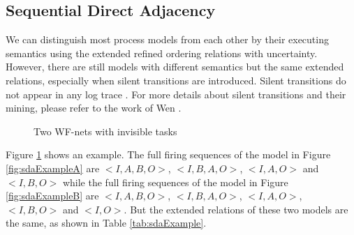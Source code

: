 \documentclass[dvips,...]{llncs}
\begin{document}
\subsection{Sequential Direct Adjacency}\label{subsec:sda}
We can distinguish most process models from each other by their executing semantics using the extended refined ordering relations with uncertainty. However, there are still models with different semantics but the same extended relations, especially when silent transitions are introduced. Silent transitions do not appear in any log trace \cite{de2003workflow} . For more details about silent transitions and their mining, please refer to the work of Wen \cite{wen2010mining}. 

\begin{figure}[htbp]
\centering
{}
\hspace{0.5cm}
\caption{Two WF-nets with invisible tasks\label{fig:sdaExample}}
\end{figure}

\begin{example}\label{ex:sda}
Figure \ref{fig:sdaExample} shows an example. The full firing sequences of the model in Figure \ref{fig:sdaExampleA} are $<I,A,B,O>$, $<I,B,A,O>$, $<I,A,O>$ and $<I,B,O>$ while the full firing sequences of the model in Figure \ref{fig:sdaExampleB} are $<I,A,B,O>$, $<I,B,A,O>$, $<I,A,O>$, $<I,B,O>$ and $<I,O>$. But the extended relations of these two models are the same, as shown in Table \ref{tab:sdaExample}.
\end{example}
\end{document}
